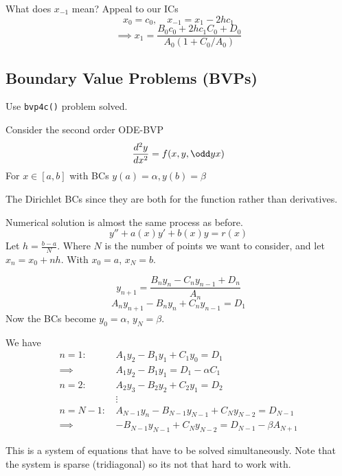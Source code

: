 \documentclass{X:/Documents/Coding/Latex/myassignment}
\begin{document}
What does $x_{-1}$ mean? 
Appeal to our ICs
\[x_0 = c_0 , \quad x_{-1} = x_1 - 2hc_1\]
\[\implies x_1  =\frac{B_0c_0 + 2h c_1C_0 + D_0}{A_0(1 + C_0/A_0)}\]


\subsection{Boundary Value Problems (BVPs)}
Use \verb|bvp4c()| problem solved. 

Consider the second order ODE-BVP
\[\frac{d^2y}{dx^2} = f(x,y,\odd yx)\] 
For $x \in \left[a,b\right]$ with BCs $y(a) = \alpha, y(b) = \beta$

The Dirichlet BCs since they are both for the function rather than derivatives.


Numerical solution is almost the same process as before.
\[y'' + a(x)y' + b(x) y = r(x)\]
Let $h = \frac{b-a}{N}$. Where $N$ is the number of points we want to consider, and let $x_n = x_0 + nh$. With $x_0 = a$, $x_N = b$.


\[y_{n+1} = \frac{B_ny_{n} - C_ny_{n-1} + D_n}{A_n}\]
\[A_n y_{n+1} - B_ny_n + C_ny_{n-1} = D_1\]
Now the BCs become $y_0 = \alpha$, $y_N = \beta$. 

We have
\begin{align*}
    n=1 : \, &A_1 y_2 - B_1 y_1 + C_1y_0 = D_1\\
    \implies &A_1 y_2 - B_1 y_1 = D_1 - \alpha C_1\\
    n=2 : \, & A_2 y_3 - B_2 y_2 + C_2 y_1 = D_2\\
    &\vdots\\
    n=N-1 : \, & A_{N-1} y_n - B_{N-1} y_{N-1} + C_N y_{N-2} = D_{N-1}\\
    \implies & -B_{N-1} y_{N-1} + C_N y_{N-2} = D_{N-1} - \beta A_{N+1}
\end{align*}

This is a system of equations that have to be solved simultaneously.
Note that the system is sparse (tridiagonal) so its not that hard to work with.





\subsection{}
\end{document}
